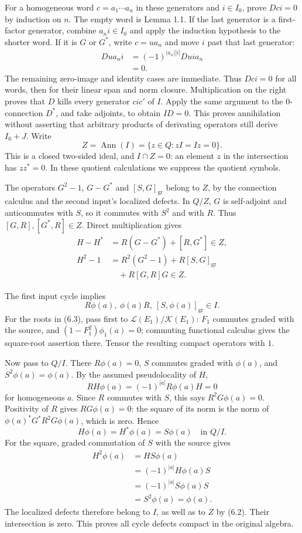 \documentclass[
  11pt,
]{article}
\begin{document}
For a homogeneous word \(c=a_1\cdots a_n\) in these generators and
\(i\in I_0\), prove \(Dci=0\) by induction on \(n\). The empty word is
Lemma 1.1. If the last generator is a first-factor generator, combine
\(a_ni\in I_0\) and apply the induction hypothesis to the shorter word.
If it is \(G\) or \(G^*\), write \(c=u a_n\) and move \(i\) past that
last generator: \[
\begin{aligned}
Du a_ni
&=(-1)^{|a_n||i|}Du i a_n\\
&=0.
\end{aligned}
\] The remaining zero-image and identity cases are immediate. Thus
\(Dci=0\) for all words, then for their linear span and norm closure.
Multiplication on the right proves that \(D\) kills every generator
\(ci c'\) of \(I\). Apply the same argument to the \(0\)-connection
\(D^*\), and take adjoints, to obtain \(ID=0\). This proves annihilation
without asserting that arbitrary products of derivating operators still
derive \(I_0+J\). Write \[
Z=\operatorname{Ann}(I)
=\{z\in Q:zI=Iz=0\}.
\] This is a closed two-sided ideal, and \(I\cap Z=0\): an element \(z\)
in the intersection has \(zz^*=0\). In these quotient calculations we
suppress the quotient symbols.

The operators \(G^2-1\), \(G-G^*\) and \([S,G]_{\mathrm{gr}}\) belong to
\(Z\), by the connection calculus and the second input's localized
defects. In \(Q/Z\), \(G\) is self-adjoint and anticommutes with \(S\),
so it commutes with \(S^2\) and with \(R\). Thus \([G,R],[G^*,R]\in Z\).
Direct multiplication gives \[
\begin{aligned}
H-H^*&=R(G-G^*)+[R,G^*]\in Z,\\
H^2-1&=R^2(G^2-1)+R[S,G]_{\mathrm{gr}}\\
&\quad+R[G,R]G\in Z.
\end{aligned}
\tag{6.2}
\]

The first input cycle implies \[
R\phi(a),\ \phi(a)R,\ [S,\phi(a)]_{\mathrm{gr}}\in I.
\tag{6.3}
\] For the roots in (6.3), pass first to
\(\mathcal L(E_1)/\mathcal K(E_1)\): \(F_1\) commutes graded with the
source, and \((1-F_1^2)\phi_1(a)=0\); commuting functional calculus
gives the square-root assertion there. Tensor the resulting compact
operators with \(1\).

Now pass to \(Q/I\). There \(R\phi(a)=0\), \(S\) commutes graded with
\(\phi(a)\), and \(S^2\phi(a)=\phi(a)\). By the assumed pseudolocality
of \(H\), \[
RH\phi(a)=(-1)^{|a|}R\phi(a)H=0
\] for homogeneous \(a\). Since \(R\) commutes with \(S\), this says
\(R^2G\phi(a)=0\). Positivity of \(R\) gives \(RG\phi(a)=0\): the square
of its norm is the norm of \(\phi(a)^*G^*R^2G\phi(a)\), which is zero.
Hence \[
H\phi(a)=H^*\phi(a)=S\phi(a)
\quad\text{in }Q/I.
\] For the square, graded commutation of \(S\) with the source gives \[
\begin{aligned}
H^2\phi(a)&=HS\phi(a)\\
&=(-1)^{|a|}H\phi(a)S\\
&=(-1)^{|a|}S\phi(a)S\\
&=S^2\phi(a)=\phi(a).
\end{aligned}
\] The localized defects therefore belong to \(I\), as well as to \(Z\)
by (6.2). Their intersection is zero. This proves all cycle defects
compact in the original algebra.
\end{document}

